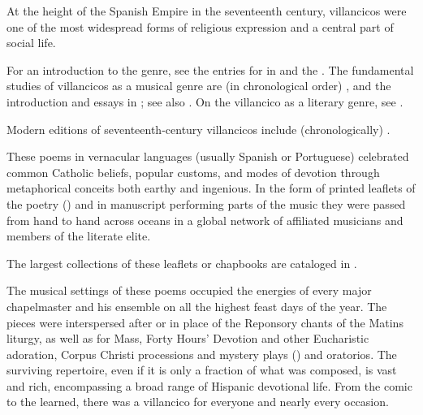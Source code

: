 
At the height of the Spanish Empire in the seventeenth century,
villancicos were one of the most widespread forms of religious expression and a central part of social life.%
  \begin{Footnote}
  For an introduction to the genre, see the entries for  in  and the .
  The fundamental studies of villancicos as a musical genre are (in chronological order) \autocites{Rubio:Forma}{CaberoPueyo:PhD}{Laird:VC}{Torrente:PhD}{Illari:Polychoral}, 
  and the introduction and essays in \autocite{Knighton-Torrente:VCs}; 
  see also \autocite{Cashner:Cards}.
  On the villancico as a literary genre, see \autocite{Tenorio:SorJuana}.

  Modern editions of seventeenth-century villancicos include (chronologically) \autocites
{Cererols:MEM-VC}
{Stevenson:Christmas}
{Ruimonte:Parnaso}
{Padilla:Tello}
{Ezquerro:MME55}
{RuizSamaniego:MME63}
{Ezquerro:MME59}
{Ezquerro:MME65}
{Fernandez:Cancionero}
{Torrejon:VCs}.
  \end{Footnote}
These poems in vernacular languages (usually Spanish or Portuguese) celebrated common Catholic beliefs, popular customs, and modes of devotion through metaphorical conceits both earthy and ingenious.
In the form of printed leaflets of the poetry () and in manuscript performing parts of the music they were passed from hand to hand across oceans in a global network of affiliated musicians and members of the literate elite.%
  \begin{Footnote}
  The largest collections of these leaflets or chapbooks are cataloged in \autocites{BNE:VCs17C}{BNE:VCs18C}{UK:VCs}{US:VCs}.
  \end{Footnote}

The musical settings of these poems occupied the energies of every major chapelmaster and his ensemble on all the highest feast days of the year.
The pieces were interspersed after or in place of the Reponsory chants of the Matins liturgy, as well as for Mass, Forty Hours' Devotion and other Eucharistic adoration, Corpus Christi processions and mystery plays () and oratorios.
The surviving repertoire, even if it is only a fraction of what was composed, is vast and rich, encompassing a broad range of Hispanic devotional life.
From the comic to the learned, there was a villancico for everyone and nearly every occasion.

